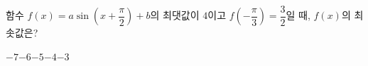 함수 $f(x)=a\sin\left(x+\dfrac{\pi}{2}\right)+b$의 최댓값이 $4$이고 $f\!\left(-\dfrac{\pi}{3}\right)=\dfrac{3}{2}$일 때, $f(x)$의 최솟값은? 
\begin{choices32}{$-7$}{$-6$}{$-5$}{$-4$}{$-3$}\end{choices32}
